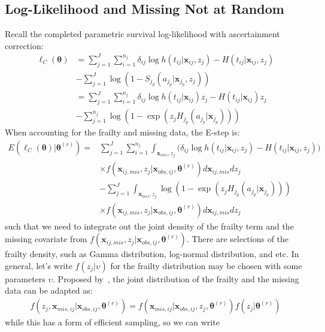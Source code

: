 \documentclass[preprint,12pt]{elsarticle}
\begin{document}
\subsection{Log-Likelihood and Missing Not at Random}
Recall the completed parametric survival log-likelihood with ascertainment correction:
\begin{align} 
    \ell_C(\boldsymbol{\theta})&=\sum_{j=1}^J\sum_{i=1}^{n_j}\delta_{ij}\log h(t_{ij}|\mathbf{x}_{ij}, z_j) - H(t_{ij}|\mathbf{x}_{ij}, z_j)\\
    &-\sum_{j=1}^J \log (1-S_{j_p}(a_{j_p}|\mathbf{x}_{j_p}, z_j)) \\
    &= \sum_{j=1}^J\sum_{i=1}^{n_j}\delta_{ij}\log h(t_{ij}|\mathbf{x}_{ij})z_j - H(t_{ij}|\mathbf{x}_{ij})z_j \\
    &- \sum_{j=1}^{n_j} \log(1- \exp(z_j H_{j_p}(a_{j_p}|\mathbf{x}_{j_p})))
\end{align}
When accounting for the frailty and missing data, the E-step is:
\begin{align} 
    E(\ell_C(\boldsymbol{\theta})|\boldsymbol{\theta}^{(r)})=&\sum_{j=1}^J\sum_{i=1}^{n_j}\int_{\mathbf{x}_{mis}, z_j}\Big (\delta_{ij}\log h(t_{ij}|\mathbf{x}_{ij}, z_j) - H(t_{ij}|\mathbf{x}_{ij}, z_j)\Big )\\
    &\times f(\mathbf{x}_{ij,mis}, z_j|\mathbf{x}_{obs,ij}, \boldsymbol{\theta}^{(r)})d\mathbf{x}_{ij,mis}dz_j\\
    &-\sum_{j=1}^J \int_{\mathbf{x}_{mis}, z_j} \log(1- \exp(z_j H_{j_p}(a_{j_p}|\mathbf{x}_{j_p})))\\
    &\times f(\mathbf{x}_{ij,mis}, z_j|\mathbf{x}_{obs,ij}, \boldsymbol{\theta}^{(r)})d\mathbf{x}_{ij,mis}dz_j
\end{align}
such that we need to integrate out the joint density of the frailty term and the missing covariate from $f(\mathbf{x}_{ij,mis}, z_j|\mathbf{x}_{obs,ij}, \boldsymbol{\theta}^{(r)})$. 
There are selections of the frailty density, such as Gamma distribution, log-normal distribution, and etc. 
In general, let's write $f(z_j|\upsilon)$ for the frailty distribution may be chosen with some parameters $\upsilon$. 
Proposed by~\citet{herring2002frailty}, the joint distribution of the frailty and the missing data can be adapted as:
\begin{align} 
    f(z_j,\mathbf{x}_{mis,ij}|\mathbf{x}_{obs,ij}, \boldsymbol{\theta}^{(r)})=f(\mathbf{x}_{mis, ij}|\mathbf{x}_{obs,ij}, z_j, \boldsymbol{\theta}^{(r)})f(z_j|\boldsymbol{\theta}^{(r)})
\end{align}
while this has a form of efficient sampling, so we can write
\end{document}
